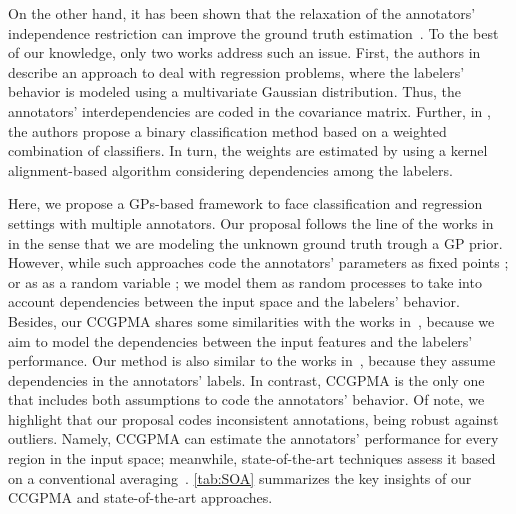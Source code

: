 \documentclass[journal]{IEEEtran}
\newcommand{\comment}[2]{{\color{blue}#1} {\color{red}#2}}
\begin{document}
On the other hand, it has been shown that the relaxation of the
annotators' independence restriction can improve the ground truth
estimation~\cite{zhang2011learning,g2019machine}. To the best of our
knowledge, only two works address such an issue. First, the authors in
\cite{zhu2019unsupervised} describe an approach to deal with
regression problems, where the labelers' behavior is modeled using a
multivariate Gaussian distribution. Thus, the annotators'
interdependencies are coded in the covariance matrix. Further, in
\cite{gil2018learning}, the authors propose a binary classification
method based on a weighted combination of classifiers. In turn, the
weights are estimated by using a kernel alignment-based algorithm
considering dependencies among the labelers.

Here, we propose a GPs-based framework to face classification and
regression settings with multiple annotators. Our proposal follows the
line of the works
in~\cite{rodrigues2014gaussian,groot2011learning,ruiz2019learning,morales2019scalable,morales2019scalable1}
in the sense that we are modeling the unknown ground truth trough a GP
prior. However, while such approaches code the annotators' parameters
as fixed points \cite{rodrigues2014gaussian,groot2011learning}; or
\comment{as}{as a}
random variable
\cite{ruiz2019learning,morales2019scalable,morales2019scalable1}; we
model them as random processes to take into account dependencies
between the input space and the labelers' behavior. Besides, our
CCGPMA shares some similarities with the works
in~\cite{yan2014learning,xiao2013learning}, because we aim to model
the dependencies between the input features and the labelers'
performance. Our method is also similar to the works
in~\cite{zhu2019unsupervised,gil2018learning}, because they assume
dependencies in the annotators' labels. In contrast, CCGPMA is the
only one that includes both assumptions to code the annotators'
behavior. Of note, we highlight that our proposal codes inconsistent
annotations, being robust against outliers.  Namely, CCGPMA can
estimate the annotators' performance for every region in the input
space; meanwhile, state-of-the-art techniques assess it based on a
conventional
averaging~\cite{rodrigues2017learning,morales2019scalable,ruiz2019learning}. \cref{tab:SOA}
summarizes the key insights of our CCGPMA and state-of-the-art
approaches.
\end{document}
